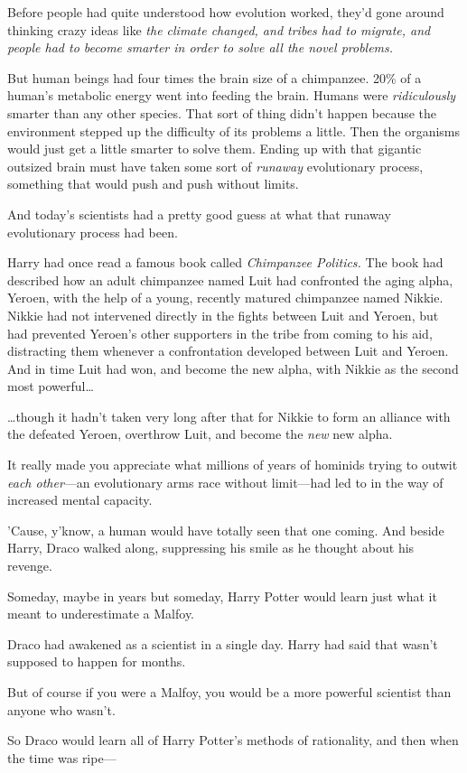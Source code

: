 Before people had quite understood how evolution worked, they'd gone around 
thinking crazy ideas like \emph{the climate changed, and tribes had to migrate, 
and people had to become smarter in order to solve all the novel problems.}

But human beings had four times the brain size of a chimpanzee. 20\% of a 
human's metabolic energy went into feeding the brain. Humans were 
\emph{ridiculously} smarter than any other species. That sort of thing didn't 
happen because the environment stepped up the difficulty of its problems a 
little. Then the organisms would just get a little smarter to solve them. 
Ending up with that gigantic outsized brain must have taken some sort of 
\emph{runaway} evolutionary process, something that would push and push without 
limits.

And today's scientists had a pretty good guess at what that runaway 
evolutionary process had been.

Harry had once read a famous book called \emph{Chimpanzee Politics.} The book 
had described how an adult chimpanzee named Luit had confronted the aging 
alpha, Yeroen, with the help of a young, recently matured chimpanzee named 
Nikkie. Nikkie had not intervened directly in the fights between Luit and 
Yeroen, but had prevented Yeroen's other supporters in the tribe from coming to 
his aid, distracting them whenever a confrontation developed between Luit and 
Yeroen. And in time Luit had won, and become the new alpha, with Nikkie as the 
second most powerful{\ldots}

{\ldots}though it hadn't taken very long after that for Nikkie to form an 
alliance with the defeated Yeroen, overthrow Luit, and become the \emph{new} 
new alpha.

It really made you appreciate what millions of years of hominids trying to 
outwit \emph{each other}---an evolutionary arms race without limit---had led to 
in the way of increased mental capacity.

'Cause, y'know, a human would have totally seen that one coming.
\sbreak
And beside Harry, Draco walked along, suppressing his smile as he thought about 
his revenge.

Someday, maybe in years but someday, Harry Potter would learn just what it 
meant to underestimate a Malfoy.

Draco had awakened as a scientist in a single day. Harry had said that wasn't 
supposed to happen for months.

But of course if you were a Malfoy, you would be a more powerful scientist than 
anyone who wasn't.

So Draco would learn all of Harry Potter's methods of rationality, and then 
when the time was ripe---